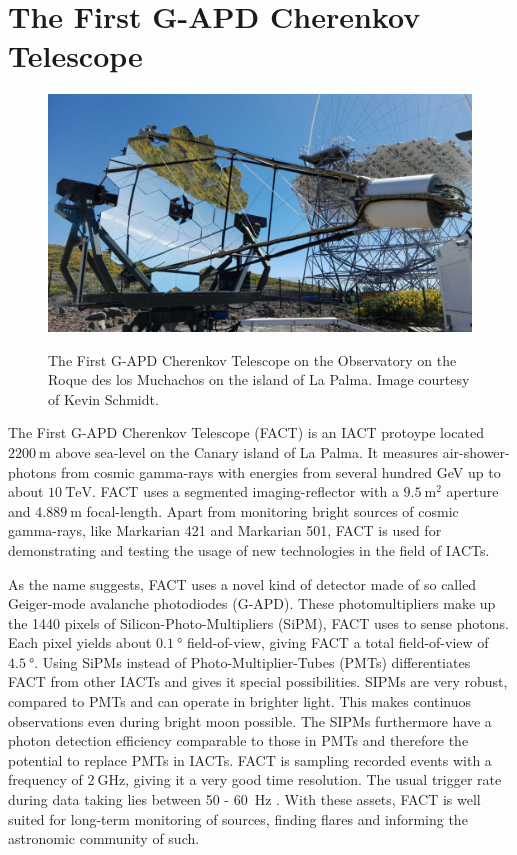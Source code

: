 \chapter{The First G-APD Cherenkov Telescope}
%
\begin{figure}
  \centering
  \includegraphics[width=\textwidth]{Plots/fact.jpg}
  \label{fig:fact}
  \caption{The First G-APD Cherenkov Telescope on the Observatory on the Roque des los Muchachos on the island of La Palma. Image courtesy of Kevin Schmidt.}
\end{figure}
%
The First G-APD Cherenkov Telescope \cite{FACT-Design} (FACT) is an IACT
protoype located $\SI{2200}{\metre}$ above sea-level on the Canary island of La
Palma. It measures air-shower-photons from cosmic gamma-rays with energies from
several hundred GeV up to about $\SI{10}{\tera\electronvolt}$. FACT uses a
segmented imaging-reflector with a $\SI{9.5}{\meter\squared}$ aperture and
$\SI{4.889}{\meter}$ focal-length. Apart from monitoring bright sources of
cosmic gamma-rays, like Markarian 421 and Markarian 501, FACT is used for
demonstrating and testing the usage of new technologies in the field of IACTs.

As the name suggests, FACT uses a novel kind of detector made of so called
Geiger-mode avalanche photodiodes (G-APD). These photomultipliers make up
the 1440 pixels of Silicon-Photo-Multipliers (SiPM), FACT uses to sense
photons. Each pixel yields about $\SI{0.1}{\degree}$ field-of-view, giving FACT
a total field-of-view of $\SI{4.5}{\degree}$. Using SiPMs instead of
Photo-Multiplier-Tubes (PMTs) differentiates FACT from other IACTs and gives it
special possibilities. SIPMs are very robust, compared to PMTs and can operate
in brighter light. This makes continuos observations even during bright moon
possible. The SIPMs furthermore have a photon detection efficiency comparable to those in PMTs and therefore the potential to replace PMTs in IACTs. FACT is sampling recorded
events with a frequency of $\SI{2}{\giga\hertz}$, giving it a very good time
resolution. The usual trigger rate during data taking lies between \num{50} - \SI{60}{\hertz} \cite{FACT-Design}. With these assets, FACT is well suited for long-term monitoring of
sources, finding flares and informing the astronomic community of such.
